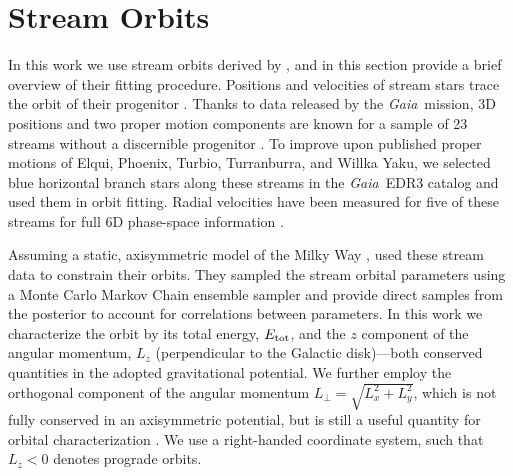 \documentclass[twocolumn]{aastex63}
\newcommand{\gaia}{\textsl{Gaia}}
\begin{document}
\section{Stream Orbits}
\label{sec:streamorbits}
In this work we use stream orbits derived by \citet{bk2021}, and in this section provide a brief overview of their fitting procedure.
Positions and velocities of stream stars trace the orbit of their progenitor \citep[e.g.,][]{kuepper2010}.
Thanks to data released by the \gaia\ mission, 3D positions and two proper motion components are known for a sample of 23 streams without a discernible progenitor \citep{ibata2019, shipp2019, riley2020}.
To improve upon published proper motions of Elqui, Phoenix, Turbio, Turranburra, and Willka Yaku, we selected blue horizontal branch stars along these streams in the \gaia\ EDR3 catalog and used them in orbit fitting.
Radial velocities have been measured for five of these streams for full 6D phase-space information \citep{caldwell2020, li2020, bonaca2020b}.


Assuming a static, axisymmetric model of the Milky Way \citep[default \texttt{MilkyWayPotential}]{gala}, \citet{bk2021} used these stream data to constrain their orbits.
They sampled the stream orbital parameters using a Monte Carlo Markov Chain ensemble sampler and provide direct samples from the posterior to account for correlations between parameters.
In this work we characterize the orbit by its total energy, $E_{\rm tot}$, and the $z$ component of the angular momentum, $L_z$ (perpendicular to the Galactic disk)---both conserved quantities in the adopted gravitational potential.
We further employ the orthogonal component of the angular momentum $L_\perp = \sqrt{L_x^2 + L_y^2}$, which is not fully conserved in an axisymmetric potential, but is still a useful quantity for orbital characterization \citep{helmi1999}.
We use a right-handed coordinate system, such that $L_z<0$ denotes prograde orbits.
\end{document}
